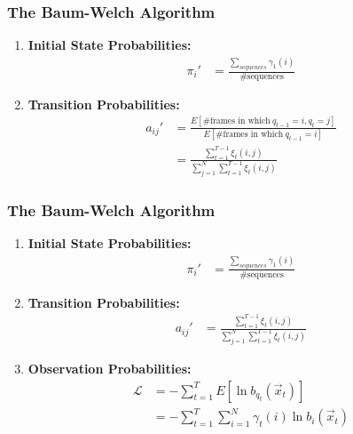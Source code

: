 \documentclass{beamer}
\begin{document}
\begin{frame}
  \frametitle{The Baum-Welch Algorithm}

  \begin{enumerate}
  \item {\bf Initial State Probabilities:}
    \begin{align*}
      \pi_i'  &=\frac{\sum_{sequences} \gamma_1(i)}{\mbox{\# sequences}}
    \end{align*}
  \item {\bf Transition Probabilities:}
    \begin{align*}
      a_{ij}'&=\frac{E\left[\mbox{\# frames in which}~q_{t-1}=i,q_t=j\right]}{E\left[\mbox{\# frames in which}~q_{t-1}=i\right]}\\
      &=\frac{\sum_{t=1}^{T-1} \xi_t(i,j)}{\sum_{j=1}^N\sum_{t=1}^{T-1}\xi_t(i,j)}
    \end{align*}
  \end{enumerate}
\end{frame}

\begin{frame}
  \frametitle{The Baum-Welch Algorithm}

  \begin{enumerate}
  \item {\bf Initial State Probabilities:}
    \begin{align*}
      \pi_i' &=\frac{\sum_{sequences} \gamma_1(i)}{\mbox{\# sequences}}
    \end{align*}
  \item {\bf Transition Probabilities:}
    \begin{align*}
      a_{ij}' &=\frac{\sum_{t=1}^{T-1} \xi_t(i,j)}{\sum_{j=1}^N\sum_{t=1}^{T-1}\xi_t(i,j)}
    \end{align*}
  \item {\bf Observation Probabilities:} 
    \begin{align*}
      {\mathcal L} &= -\sum_{t=1}^T E\left[\ln b_{q_t}(\vec{x}_t)\right]\\
      &= -\sum_{t=1}^T\sum_{i=1}^N  \gamma_t(i)\ln b_{i}(\vec{x}_t)
    \end{align*}
  \end{enumerate}
\end{frame}
\end{document}

